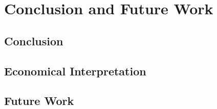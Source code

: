 \chapter{Conclusion and Future Work}
\section{Conclusion}
\section{Economical Interpretation}
\section{Future Work}

